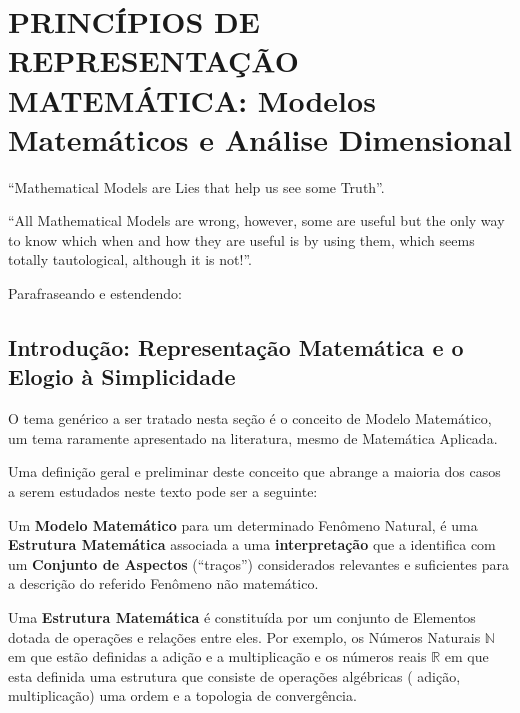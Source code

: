 \renewcommand\title{MODELOS MATEMÁTICOS} %




\chapter{PRINCÍPIOS DE REPRESENTAÇÃO MATEMÁTICA: Modelos Matemáticos e Análise Dimensional}

\begin{citacao}
``Mathematical Models are Lies that help us see some Truth''.


``All Mathematical Models are wrong, however, some are useful but the only way to know which when and how they are useful is by using them, which seems totally tautological, although it is not!''.

Parafraseando e estendendo:

\end{citacao}

\section{Introdução: Representação Matemática e o Elogio à Simplicidade}

    O tema genérico a ser tratado nesta seção é o conceito de Modelo Matemático, um tema raramente apresentado na literatura, mesmo de Matemática Aplicada.

    Uma definição geral e preliminar deste conceito que abrange a maioria dos casos a serem estudados neste texto pode ser a seguinte:

    Um \textbf{Modelo Matemático} para um determinado Fenômeno Natural, é uma \textbf{Estrutura Matemática} associada a uma \textbf{interpretação} que a identifica com um \textbf{Conjunto de Aspectos} (``traços'') considerados relevantes e suficientes para a descrição do referido Fenômeno não matemático.

    Uma \textbf{Estrutura Matemática} é constituída {\color{orange} por} um conjunto de Elementos dotada de operações e relações entre eles. Por exemplo, os Números Naturais \(\mathbb{N}\) em que estão definidas {\color{orange} a adição e a multiplicação} e os números reais \(\mathbb{R}\) em que esta definida uma estrutura que consiste de operações algébricas ({\color{orange} adição, multiplicação}) uma ordem e a topologia de convergência.
    
